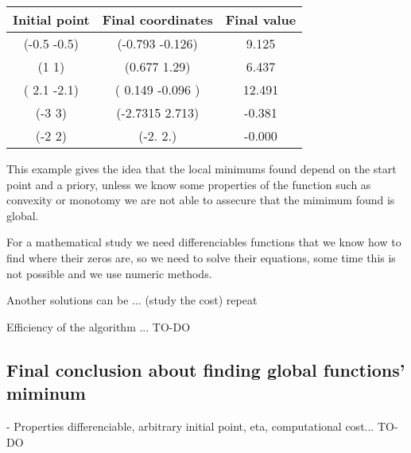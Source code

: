 \begin{center}
  \begin{tabular}{ |c|c|c| }
    \hline
    Initial point  & Final coordinates & Final value  \\ 
    \hline

    (-0.5 -0.5) &  (-0.793 -0.126) &   9.125 \\
(1 1) &  (0.677 1.29) &   6.437 \\
( 2.1 -2.1) &  ( 0.149 -0.096 ) &   12.491 \\
(-3  3) &  (-2.7315  2.713) &  -0.381 \\
(-2  2) &  (-2.  2.) &  -0.000 \\
    
 
 \hline
\end{tabular}
\end{center}


This example gives the idea that the local minimums found depend on the start point and a priory, unless we know some properties
of the function such as convexity or monotomy we are not able to assecure that the mimimum found is global.

For a mathematical study we need differenciables functions that we know how to find where their zeros are, so we need to solve their equations, some time
this is not possible and we use numeric methods.

Another solutions can be ... (study the cost) repeat

Efficiency of the algorithm ... TO-DO



\subsection{ Final conclusion about finding global functions' miminum}  


- Properties differenciable, arbitrary initial point, eta, computational cost...  TO-DO


